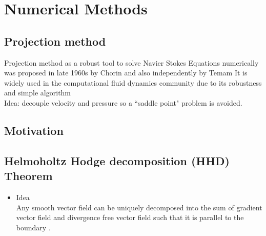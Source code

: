 \chapter{Numerical Methods}
\label{chapter4}
\section{Projection method}
Projection method as a robust tool to solve Navier Stokes Equations numerically was proposed in late 1960s by Chorin and also independently by Temam \cite{chorin1968numerical,almgren2000approximate,almgren1996numerical,brown2001accurate,chorin1990mathematical,johnston2002finite,maria2003application}
It is widely used in the computational fluid dynamics community due to its robustness and simple algorithm\\

Idea: decouple velocity and pressure so a ``saddle point" problem is avoided.

\section{Motivation}

\section{Helmoholtz Hodge decomposition (HHD) Theorem}
\begin{itemize}
\item Idea\\
Any smooth vector field can be uniquely decomposed into the sum of gradient vector field and divergence free vector field such that it is parallel to the boundary \cite{chorin1990mathematical,maria2003application}.\\
\end{itemize}

